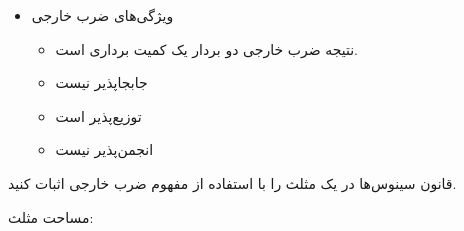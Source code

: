 \begin{ELjoin}

\begin{itemize}
\tightlist
\item
  ویژگی‌های ضرب خارجی

  \begin{itemize}
  \item
    نتیجه ضرب خارجی دو بردار یک کمیت برداری است.
  \item
    جابجاپذیر نیست
  \item
    توزیع‌پذیر است
  \item
    انجمن‌پذیر نیست
  \end{itemize}
\end{itemize}


\begin{ELexample}{}

قانون سینوس‌ها در یک مثلث را با استفاده از مفهوم ضرب خارجی اثبات کنید.


\begin{ELsolution}

مساحت مثلث:

\end{ELsolution}

\end{ELexample}

\end{ELjoin}

\ELhold


